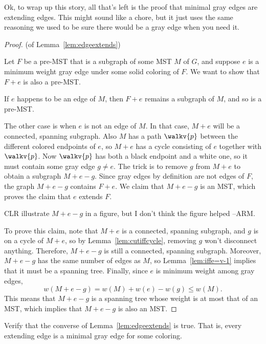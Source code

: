 Ok, to wrap up this story, all that's left is the proof that minimal
gray edges are extending edges.  This might sound like a chore, but it
just uses the same reasoning we used to be sure there would be a gray
edge when you need it.

\begin{proof} (of Lemma~\ref{lem:edgeextends})

  Let $F$ be a pre-MST that is a subgraph of some MST $M$ of $G$, and
  suppose $e$ is a minimum weight gray edge under some solid coloring of
  $F$.  We want to show that $F+e$ is also a pre-MST.

  If $e$ happens to be an edge of $M$, then $F+e$ remains a subgraph of
  $M$, and so is a pre-MST.

  The other case is when $e$ is not an edge of $M$.  In that case,
  $M+e$ will be a connected, spanning subgraph.  Also $M$ has a path
  $\walkv{p}$ between the different colored endpoints of $e$, so $M+e$
  has a cycle consisting of $e$ together with $\walkv{p}$.  Now
  $\walkv{p}$ has both a black endpoint and a white one, so it must
  contain some gray edge $g \neq e$.  The trick is to remove $g$ from
  $M+e$ to obtain a subgraph $M+e-g$.  Since gray edges by definition
  are not edges of $F$, the graph $M+e-g$ contains $F+e$.  We claim
  that $M+e-g$ is an MST, which proves the claim that $e$ extends $F$.

\begin{editingnotes}
  CLR illustrate $M+e-g$ in a figure, but I don't think the figure helped
  --ARM.
\end{editingnotes}

   To prove this claim, note that $M+e$ is a connected, spanning
   subgraph, and $g$ is on a cycle of $M+e$, so by
   Lemma~\ref{lem:cutiffcycle}, removing $g$ won't disconnect
   anything.  Therefore, $M+e-g$ is still a connected, spanning
   subgraph.  Moreover, $M+e-g$ has the same number of edges as $M$,
   so Lemma~\ref{lem:iffe=v-1} implies that it must be a spanning
   tree.  Finally, since $e$ is minimum weight among gray
   edges,\iffalse $w(e) \leq w(g)$, and therefore\fi
   \[
   w(M+e-g) = w(M) + w(e) - w(g) \leq w(M).
   \]
   This means that $M+e-g$ is a spanning tree whose weight is at most
   that of an MST, which implies that $M+e-g$ is also an MST.
\end{proof}

\begin{editingnotes}
  Verify that the converse of Lemma~\ref{lem:edgeextends} is true.
  That is, every extending edge is a minimal gray edge for some
  coloring.
\end{editingnotes}

